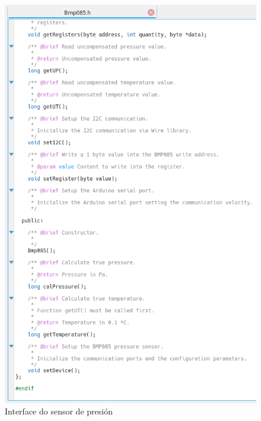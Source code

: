    \begin{figure}[htbp]
    \centering
    \includegraphics[scale=0.8,keepaspectratio=true]{./imagenes/interface-sensor-presion.png}
    \caption{Interface do sensor de presión}
    \label{figura:InterfaceSensorPresion}
   \end{figure}
   
